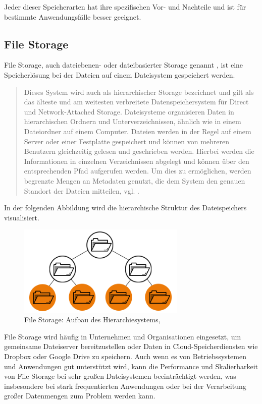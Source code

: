 Jeder dieser Speicherarten hat ihre spezifischen Vor- und Nachteile und ist für bestimmte Anwendungsfälle besser geeignet. 

\newpage
 
\subsection{File Storage}

File Storage, auch dateiebenen- oder dateibasierter Storage genannt \cite{redHat-storage}, ist eine Speicherlösung bei der Dateien auf einem Dateisystem gespeichert werden. 

\begin{quote}
	Dieses System wird auch als hierarchischer Storage bezeichnet und gilt als das älteste und am weitesten verbreitete Datenspeichersystem für Direct und Network-Attached Storage. Dateisysteme organisieren Daten in hierarchischen Ordnern und Unterverzeichnissen, ähnlich wie in einem Dateiordner auf einem Computer. Dateien werden in der Regel auf einem Server oder einer Festplatte gespeichert und können von mehreren Benutzern gleichzeitig gelesen und geschrieben werden. Hierbei werden die Informationen in einzelnen Verzeichnissen abgelegt und können über den entsprechenden Pfad aufgerufen werden. Um dies zu ermöglichen, werden begrenzte Mengen an Metadaten genutzt, die dem System den genauen Standort der Dateien mitteilen, vgl. \citeauthor{redHat-storage}.
\end{quote}

In der folgenden Abbildung wird die hierarchische Struktur des Dateispeichers visualisiert.

\begin{figure}[h]
\centering
	\includegraphics[width=8cm,keepaspectratio]{Pictures/FileStorageHierarchy.png}
	\caption{File Storage: Aufbau des Hierarchiesystems, \citeauthor{redHat-storage}}
\end{figure}

File Storage wird häufig in Unternehmen und Organisationen eingesetzt, um gemeinsame Dateiserver bereitzustellen oder Daten in Cloud-Speicherdiensten wie Dropbox oder Google Drive zu speichern.
Auch wenn es von Betriebssystemen und Anwendungen gut unterstützt wird, kann die Performance und Skalierbarkeit von File Storage bei sehr großen Dateisystemen beeinträchtigt werden, was insbesondere bei stark frequentierten Anwendungen oder bei der Verarbeitung großer Datenmengen zum Problem werden kann. 

